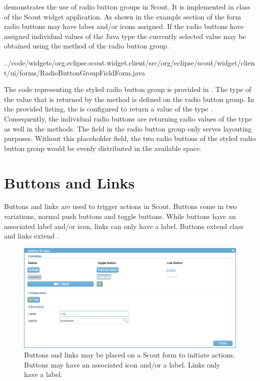 \documentclass[a4paper,10pt,twoside]{book}
\begin{document}
 demonstrates the use of radio button groups in Scout. 
It is implemented in class  of the Scout widget application. 
As shown in the example section of the form radio buttons may have labes and/or icons assigned. 
If the radio buttons have assigned individual values of the Java type  the currently selected value may be obtained using the  method of the radio button group. 


{../code/widgets/org.eclipse.scout.widget.client/src/org/eclipse/scout/widget/client/ui/forms/RadioButtonGroupFieldForm.java}

The code representing the styled radio button group is provided in . 
The type of the value that is returned by the  method is defined on the radio button group. 
In the provided listing, the  is configured to return a value of the type . 
Consequently, the individual radio buttons are returning radio values of the type  as well in the  methods.
The field  in the radio button group only serves layouting purposes. 
Without this placeholder field, the two radio buttons of the styled radio button group would be evenly distributed in the available space. 

\section{Buttons and Links}

Buttons and links are used to trigger actions in Scout. 
Buttons come in two variations, normal push buttons and toggle buttons. 
While buttons have an associated label and/or icon, links can only have a label. 
Buttons extend class  and links extend . 

\begin{figure}
\includegraphics[width=15cm]{buttonlink.png}
\caption{Buttons and links may be placed on a Scout form to initiate actions.
Buttons may have an associated icon and/or a label.
Links only have a label.}
\end{figure}
\end{document}
